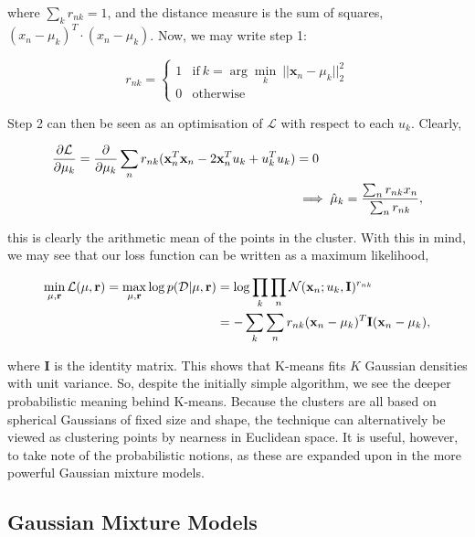 \documentclass[11pt]{amsart}
\begin{document}
where $\sum_k r_{nk} = 1$, and the distance measure is the sum of squares, $(x_n - \mu_k)^T\cdot(x_n - \mu_k)$. Now, we may write step 1:

\[r_{nk} = \begin{cases}
    1 & \text{if} \ k = \arg \min_k \ ||\mathbf{x}_n - \mu_k||_2^2 \\
    0 & \text{otherwise}
\end{cases}\]

Step 2 can then be seen as an optimisation of $\mathcal{L}$ with respect to each $u_k$. Clearly,

\begin{align}\frac{\partial\mathcal{L}}{\partial\mu_k} = \frac{\partial}{\partial\mu_k}\sum_n r_{nk} (\mathbf{x}_n^T\mathbf{x}_n - 2\mathbf{x}_n^Tu_k + u_k^Tu_k) &= 0 \notag \\
&\implies \hat{\mu}_k = \frac{\sum_nr_{nk}x_n}{\sum_nr_{nk}}, \notag
\end{align}

this is clearly the arithmetic mean of the points in the cluster. With this in mind, we may see that our loss function can be written as a maximum likelihood,

\begin{align}\min_{\mu, \mathbf{r}} \mathcal{L}(\mu, \mathbf{r}) = \max_{\mu, \mathbf{r}} \log p(\mathcal{D} | \mu, \mathbf{r}) &= \log\prod_k\prod_n \mathcal{N}(\mathbf{x}_n ; u_k, \mathbf{I})^{r_{nk}} \notag \\
&= -\sum_k\sum_nr_{nk}(\mathbf{x}_n - \mu_k)^T\mathbf{I}(\mathbf{x}_n - \mu_k), \notag
\end{align}

where $\mathbf{I}$ is the identity matrix. This shows that K-means fits $K$ Gaussian densities with unit variance. So, despite the initially simple algorithm, we see the deeper probabilistic meaning behind K-means. Because the clusters are all based on spherical Gaussians of fixed size and shape, the technique can alternatively be viewed as clustering points by nearness in Euclidean space. It is useful, however, to take note of the probabilistic notions, as these are expanded upon in the more powerful Gaussian mixture models.

\subsection{Gaussian Mixture Models}
\end{document}
